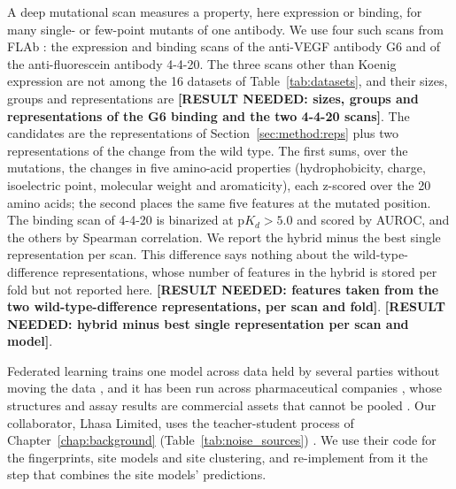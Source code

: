 A deep mutational scan measures a property, here expression or binding, for many single- or few-point mutants of one antibody. We use four such scans from FLAb \citep{Chungyoun2024}: the expression and binding scans of the anti-VEGF antibody G6 \citep{Koenig2017} and of the anti-fluorescein antibody 4-4-20. The three scans other than Koenig expression are not among the 16 datasets of Table~\ref{tab:datasets}, and their sizes, groups and representations are \textbf{[RESULT NEEDED: sizes, groups and representations of the G6 binding and the two 4-4-20 scans]}. The candidates are the representations of Section~\ref{sec:method:reps} plus two representations of the change from the wild type. The first sums, over the mutations, the changes in five amino-acid properties (hydrophobicity, charge, isoelectric point, molecular weight and aromaticity), each z-scored over the 20 amino acids; the second places the same five features at the mutated position. The binding scan of 4-4-20 is binarized at $\mathrm{p}K_d > 5.0$ and scored by AUROC, and the others by Spearman correlation. We report the hybrid minus the best single representation per scan. This difference says nothing about the wild-type-difference representations, whose number of features in the hybrid is stored per fold but not reported here. \textbf{[RESULT NEEDED: features taken from the two wild-type-difference representations, per scan and fold]}. \textbf{[RESULT NEEDED: hybrid minus best single representation per scan and model]}.

Federated learning trains one model across data held by several parties without moving the data \citep{McMahan2017}, and it has been run across pharmaceutical companies \citep{Heyndrickx2024}, whose structures and assay results are commercial assets that cannot be pooled \citep{Hanser2023,Bassani2023}. Our collaborator, Lhasa Limited, uses the teacher-student process of Chapter~\ref{chap:background} (Table~\ref{tab:noise_sources}) \citep{Hanser2025}. We use their code for the fingerprints, site models and site clustering, and re-implement from it the step that combines the site models' predictions.

